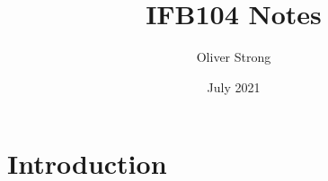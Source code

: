 \documentclass{article}
\title{IFB104 Notes}
\author{Oliver Strong}
\date{July 2021}
\begin{document}
\maketitle

\section{Introduction}
\end{document}
